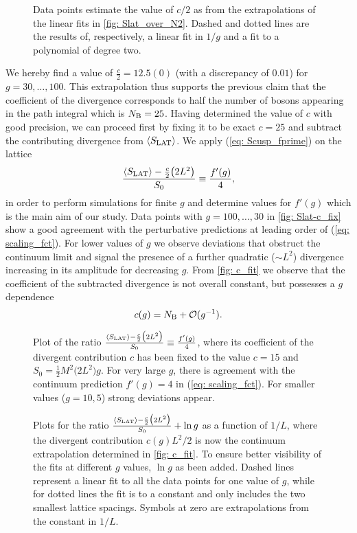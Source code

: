 %
%
\begin{figure}[ht!]
\centering

\caption{Data points estimate the value of $c/2$ as from the extrapolations of the linear fits in \autoref{fig: Slat_over_N2}. Dashed and dotted lines are the results of, respectively, a linear fit in $1/g$ and a fit to a polynomial of degree two.
\label{fig: c_fit}}
\end{figure}
%
%
We hereby find a value of $\frac{c}{2}=12.5(0)$ (with a discrepancy of $0.01$) for $g=30,\ldots,100$. This extrapolation thus supports the previous claim that the coefficient of the divergence corresponds to half the number of bosons appearing in the path integral which is $N_{\rm B}=25$. Having determined the value of $c$ with good precision, we can proceed first by fixing it to be exact $c=25$ and subtract the contributing divergence from $\langle S_{\rm LAT} \rangle$. We apply (\ref{eq: Scusp_fprime}) on the lattice
%
%
\begin{equation}
\frac{\langle S_{\rm LAT}\rangle -\frac{c}{2}\big(2L^{2}\big)}{S_{0}} \equiv \frac{f'(g)}{4},
\label{eq: Slat_fprime}
\end{equation}
%
%
in order to perform simulations for finite $g$ and determine values for $f'(g)$ which is the main aim of our study. Data points with $g=100,\ldots,30$ in \autoref{fig: Slat-c_fix} show a good agreement with the perturbative predictions at leading order of (\ref{eq: scaling_fct}). For lower values of $g$ we observe deviations that obstruct the continuum limit and signal the presence of a further quadratic ($\sim L^{2}$) divergence increasing in its amplitude for decreasing $g$. From \autoref{fig: c_fit} we observe that the coefficient of the subtracted divergence is not overall constant, but possesses a $g$ dependence
%
%
\begin{equation}
c(g) = N_{\rm B} + \mathcal{O}(g^{-1}).
\end{equation}
%
%
\begin{figure}
\centering

\caption{Plot of the ratio $\frac{\langle S_{\rm LAT}\rangle -\frac{c}{2}\big(2L^{2}\big)}{S_{0}} \equiv \frac{f'(g)}{4}$, where its coefficient of the divergent contribution $c$ has been fixed to the value $c=15$ and $S_{0}=\frac{1}{2}M^{2}\big(2L^{2}\big)g$. For very large $g$, there is agreement with the continuum prediction $f'(g)=4$ in (\ref{eq: scaling_fct}). For smaller values ($g=10,5$) strong deviations appear.
\label{fig: Slat-c_fix}}
\end{figure}
%
%
\begin{figure}
\centering

\caption{Plots for the ratio $\frac{\langle S_{\rm LAT}\rangle -\frac{c}{2}\big(2L^{2}\big)}{S_{0}} + \ln g$ as a function of $1/L$, where the divergent contribution $c(g) L^{2}/2$ is now the continuum extrapolation determined in \autoref{fig: c_fit}. To ensure better visibility of the fits at different $g$ values, $\ln g$ as been added. Dashed lines represent a linear fit to all the data points for one value of $g$, while for dotted lines the fit is to a constant and only includes the two smallest lattice spacings. Symbols at zero are extrapolations from the constant in $1/L$.
\label{fig: Slat-c_g}}
\end{figure}
